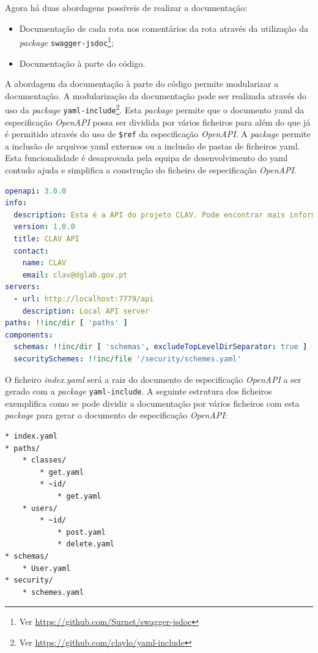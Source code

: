 Agora há duas abordagens possíveis de realizar a documentação:
\begin{itemize}
    \item Documentação de cada rota nos comentários da rota através da utilização da 
    \textit{package} \texttt{swagger-jsdoc}\footnote{Ver \url{https://github.com/Surnet/swagger-jsdoc}};
    \item Documentação à parte do código.
\end{itemize}

A abordagem da documentação à parte do código permite modularizar a documentação. A modularização da documentação 
pode ser realizada através do uso da \textit{package} \texttt{yaml-include}\footnote{Ver \url{https://github.com/claylo/yaml-include}}. Esta \textit{package} permite que o documento \acrshort{yaml} da especificação \textit{OpenAPI} possa ser dividida por vários ficheiros para além do que já é permitido através do uso de \verb|$ref| da especificação \textit{OpenAPI}. A \textit{package} permite a inclusão de arquivos \acrshort{yaml} externos ou a inclusão de pastas de ficheiros \acrshort{yaml}. Esta funcionalidade é desaprovada pela equipa de desenvolvimento do \acrshort{yaml} contudo ajuda e simplifica a construção do ficheiro de especificação \textit{OpenAPI}.

\begin{lstlisting}[language=yaml, caption=Exemplo de uso do \texttt{yaml-include} no documento de especificação \textit{OpenAPI}(\textit{index.yaml}), label=exem:yamli]
openapi: 3.0.0
info:
  description: Esta é a API do projeto CLAV. Pode encontrar mais informação sobre o CLAV em [http://clav.dglab.gov.pt](http://clav.dglab.gov.pt).
  version: 1.0.0
  title: CLAV API
  contact:
    name: CLAV
    email: clav@dglab.gov.pt
servers:
  - url: http://localhost:7779/api
    description: Local API server
paths: !!inc/dir [ 'paths' ]
components:
  schemas: !!inc/dir [ 'schemas', excludeTopLevelDirSeparator: true ]
  securitySchemes: !!inc/file '/security/schemes.yaml'
\end{lstlisting}

O ficheiro \textit{index.yaml} será a raiz do documento de especificação \textit{OpenAPI} a ser gerado com 
a \textit{package} \texttt{yaml-include}. A seguinte estrutura dos ficheiros exemplifica como se pode dividir a 
documentação por vários ficheiros com esta \textit{package} para gerar o documento de especificação \textit{OpenAPI}:
\begin{lstlisting}[caption=Exemplo de estrutura dos ficheiros para gerar o documento de especificação \textit{OpenAPI}, label=exem:faf]
* index.yaml
* paths/
    * classes/
        * get.yaml
        * ~id/
            * get.yaml
    * users/
        * ~id/
            * post.yaml
            * delete.yaml
* schemas/
    * User.yaml
* security/
    * schemes.yaml
\end{lstlisting}

